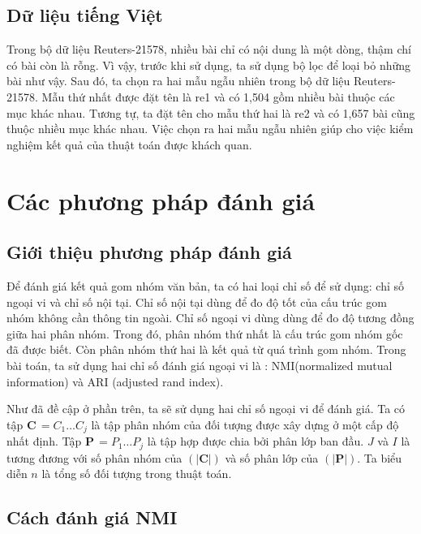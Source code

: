 \subsection{Dữ liệu tiếng Việt}
Trong bộ dữ liệu Reuters-21578, nhiều bài chỉ có nội dung là một dòng, thậm chí có bài còn là rỗng.
Vì vậy, trước khi sử dụng, ta sử dụng bộ lọc để loại bỏ những bài như vậy.
Sau đó, ta chọn ra hai mẫu ngẫu nhiên trong bộ dữ liệu Reuters-21578.
Mẫu thứ nhất được đặt tên là re1 và có 1,504 gồm nhiều bài thuộc các mục khác nhau.
Tương tự, ta đặt tên cho mẫu thứ hai là re2 và có 1,657 bài cũng thuộc nhiều mục khác nhau.
Việc chọn ra hai mẫu ngẫu nhiên giúp cho việc kiểm nghiệm kết quả của thuật toán được khách quan.


\section{Các phương pháp đánh giá}

	\subsection{Giới thiệu phương pháp đánh giá}
	Để đánh giá kết quả gom nhóm văn bản, ta có hai loại chỉ số để sử dụng: chỉ số ngoại vi và chỉ số nội tại.
	Chỉ số nội tại dùng để đo độ tốt của cấu trúc gom nhóm không cần thông tin ngoài.
	Chỉ số ngoại vi dùng dùng để đo độ tương đồng giữa hai phân nhóm.
	Trong đó, phân nhóm thứ nhất là cấu trúc gom nhóm gốc đã được biết.
	Còn phân nhóm thứ hai là kết quả từ quá trình gom nhóm.
	Trong bài toán, ta sử dụng hai chỉ số đánh giá ngoại vi là : NMI(normalized mutual information) và ARI (adjusted rand index).
	
	Như đã đề cập ở phần trên, ta sẽ sử dụng hai chỉ số ngoại vi để đánh giá.
	Ta có tập $\textbf{C} \, = {C_1 \ldots C_j}$ là tập phân nhóm của đối tượng được xây dựng ở một cấp độ nhất định.
	Tập $\textbf{P} \, = {P_1 \ldots P_j}$ là tập hợp được chia bởi phân lớp ban đầu. $J$ và $I$ là tương đương với số phân nhóm của $(|\textbf{C}|)$ và số phân lớp của  $(|\textbf{P}|)$.
	Ta biểu diễn $n$ là tổng số đối tượng trong thuật toán.

	\subsection{Cách đánh giá NMI}
